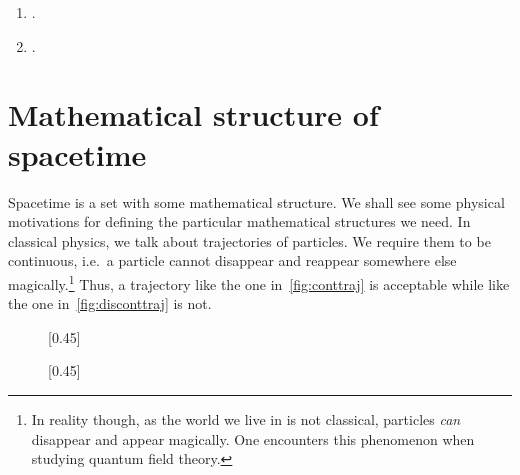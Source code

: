 \documentclass[a4 paper, 12pt]{book}
\theoremstyle{definition}
\begin{document}
    \begin{enumerate}
        \item {}.
        \item {}.
    \end{enumerate}

    \section{Mathematical structure of spacetime}

    Spacetime is a set with some mathematical structure. We shall see some physical motivations for defining the particular mathematical structures we need. In classical physics, we talk about trajectories of particles. We require them to be continuous, i.e.\ a particle cannot disappear and reappear somewhere else magically.\footnote{In reality though, as the world we live in is not classical, particles \textit{can} disappear and appear magically. One encounters this phenomenon when studying quantum field theory.} Thus, a trajectory like the one in~\cref{fig:conttraj} is acceptable while like the one in~\cref{fig:disconttraj} is not.

    \begin{figure}[htb]
        \centering
        [0.45\textwidth]
        {
        }
        \hfill
        [0.45\textwidth]
        {
        }
        \label{fig:traj}
    \end{figure}
\end{document}
